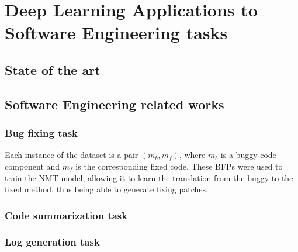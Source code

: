 \chapter{Deep Learning Applications to Software Engineering tasks}

\section{State of the art}
\section{Software Engineering related works}
\subsection{Bug fixing task}
Each instance of the dataset is a pair $(m_b, m_f)$, where $m_b$ is a buggy code component and $m_f$ is the
corresponding fixed code. These BFPs were used to train the NMT model, allowing it to learn the translation
from the buggy to the fixed method, thus being able to generate fixing patches.
\subsection{Code summarization task}
\subsection{Log generation task}
\section{}